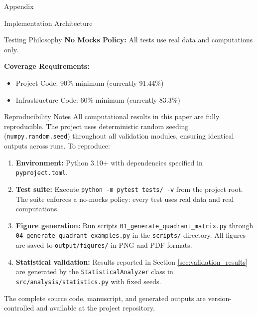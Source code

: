 \documentclass[
  ignorenonframetext,
]{beamer}
\providecommand{\tightlist}{%
  \setlength{\itemsep}{0pt}\setlength{\parskip}{0pt}}
\begin{document}
\begin{frame}[fragile]{Appendix}
\begin{block}{Implementation Architecture}
\begin{block}{Testing Philosophy}
\protect{}\label{testing-philosophy}
\textbf{No Mocks Policy:} All tests use real data and computations only.

\textbf{Coverage Requirements:}

\begin{itemize}
\tightlist
\item
  Project Code: 90\% minimum (currently 91.44\%)
\item
  Infrastructure Code: 60\% minimum (currently 83.3\%)
\end{itemize}
\end{block}
\end{block}

\begin{block}{Reproducibility Notes}
\protect{}\label{reproducibility-notes}
All computational results in this paper are fully reproducible. The
project uses deterministic random seeding (\texttt{numpy.random.seed})
throughout all validation modules, ensuring identical outputs across
runs. To reproduce:

\begin{enumerate}
\tightlist
\item
  \textbf{Environment:} Python 3.10+ with dependencies specified in
  \texttt{pyproject.toml}.
\item
  \textbf{Test suite:} Execute \texttt{python\ -m\ pytest\ tests/\ -v}
  from the project root. The suite enforces a no-mocks policy: every
  test uses real data and real computations.
\item
  \textbf{Figure generation:} Run scripts
  \texttt{01\_generate\_quadrant\_matrix.py} through
  \texttt{04\_generate\_quadrant\_examples.py} in the \texttt{scripts/}
  directory. All figures are saved to \texttt{output/figures/} in PNG
  and PDF formats.
\item
  \textbf{Statistical validation:} Results reported in Section
  \ref{sec:validation_results} are generated by the
  \texttt{StatisticalAnalyzer} class in
  \texttt{src/analysis/statistics.py} with fixed seeds.
\end{enumerate}

The complete source code, manuscript, and generated outputs are
version-controlled and available at the project repository.
\end{block}


\end{frame}
\end{document}

